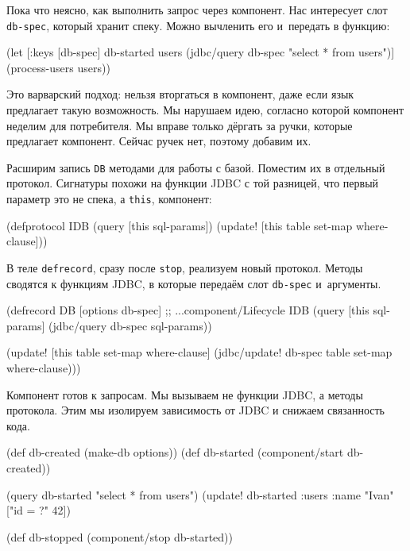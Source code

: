 Пока что неясно, как выполнить запрос через компонент. Нас интересует слот
\verb|db-spec|, который хранит спеку. Можно вычленить его и~передать в функцию:

\begin{english}
  \begin{clojure}
(let [{:keys [db-spec]} db-started
      users (jdbc/query db-spec "select * from users")]
  (process-users users))
  \end{clojure}
\end{english}

Это варварский подход: нельзя вторгаться в компонент, даже если язык предлагает
такую возможность. Мы нарушаем идею, согласно которой компонент неделим для
потребителя. Мы вправе только дёргать за ручки, которые предлагает
компонент. Сейчас ручек нет, поэтому добавим их.

Расширим запись \verb|DB| методами для работы с базой. Поместим их в отдельный
протокол. Сигнатуры похожи на функции JDBC с той разницей, что первый параметр
это не спека, а \verb|this|, компонент:


\begin{english}
  \begin{clojure}
(defprotocol IDB
  (query [this sql-params])
  (update! [this table set-map where-clause]))
  \end{clojure}
\end{english}

В теле \verb|defrecord|, сразу после \verb|stop|, реализуем новый
протокол. Методы сводятся к функциям JDBC, в которые передаём слот
\verb|db-spec| и~аргументы.

\begin{english}
  \begin{clojure}
(defrecord DB [options db-spec]
  ;; ...component/Lifecycle
  IDB
  (query [this sql-params]
    (jdbc/query db-spec sql-params))

  (update! [this table set-map where-clause]
    (jdbc/update! db-spec table set-map where-clause)))
  \end{clojure}
\end{english}

Компонент готов к запросам. Мы вызываем не функции JDBC, а методы
протокола. Этим мы изолируем зависимость от JDBC и снижаем связанность кода.

\begin{english}
  \begin{clojure}
(def db-created (make-db options))
(def db-started (component/start db-created))

(query db-started "select * from users")
(update! db-started :users {:name "Ivan"} ["id = ?" 42])

(def db-stopped (component/stop db-started))
  \end{clojure}
\end{english}

